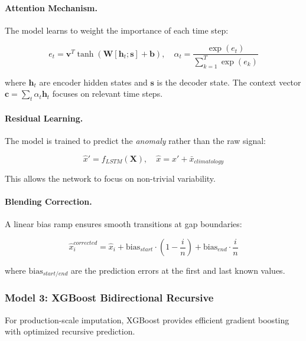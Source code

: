 \documentclass[12pt,a4paper]{article}
\begin{document}
\paragraph{Attention Mechanism.} The model learns to weight the importance of each time step:

\begin{equation}
    e_t = \mathbf{v}^T \tanh(\mathbf{W}[\mathbf{h}_t; \mathbf{s}] + \mathbf{b}), \quad
    \alpha_t = \frac{\exp(e_t)}{\sum_{k=1}^{T} \exp(e_k)}
\end{equation}

where $\mathbf{h}_t$ are encoder hidden states and $\mathbf{s}$ is the decoder state. The context vector $\mathbf{c} = \sum_t \alpha_t \mathbf{h}_t$ focuses on relevant time steps.

\paragraph{Residual Learning.} The model is trained to predict the \textit{anomaly} rather than the raw signal:

\begin{equation}
    \hat{x}' = f_{LSTM}(\mathbf{X}), \quad \hat{x} = \hat{x}' + \bar{x}_{climatology}
\end{equation}

This allows the network to focus on non-trivial variability.

\paragraph{Blending Correction.} A linear bias ramp ensures smooth transitions at gap boundaries:

\begin{equation}
    \hat{x}_i^{corrected} = \hat{x}_i + \text{bias}_{start} \cdot \left(1 - \frac{i}{n}\right) + \text{bias}_{end} \cdot \frac{i}{n}
\end{equation}

where $\text{bias}_{start/end}$ are the prediction errors at the first and last known values.

\subsubsection{Model 3: XGBoost Bidirectional Recursive}

For production-scale imputation, XGBoost provides efficient gradient boosting with optimized recursive prediction.
\end{document}
